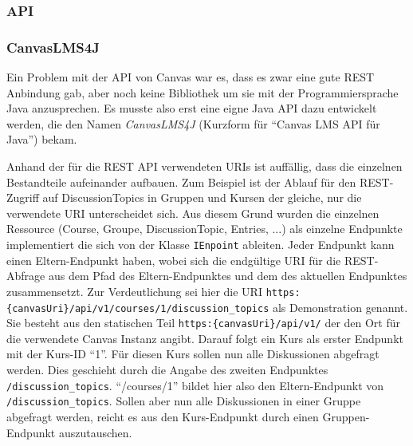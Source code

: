 \subsubsection{API} %
\label{ssub:canvas_api}


\subsubsection{CanvasLMS4J} %
\label{ssub:canvaslms4j}

Ein Problem mit der API von Canvas war es, dass es zwar eine gute REST Anbindung gab, aber noch keine Bibliothek um sie mit der Programmiersprache Java anzusprechen. Es musste also erst eine eigne Java API dazu entwickelt werden, die den Namen \emph{CanvasLMS4J} (Kurzform für \enquote{Canvas LMS API für Java}) bekam. 

Anhand der für die REST API verwendeten URIs ist auffällig, dass die einzelnen Bestandteile aufeinander aufbauen. Zum Beispiel ist der Ablauf für den REST-Zugriff auf DiscussionTopics in Gruppen und Kursen der gleiche, nur die verwendete URI unterscheidet sich. Aus diesem Grund wurden die einzelnen Ressource (Course, Groupe, DiscussionTopic, Entries, ...) als einzelne Endpunkte implementiert die sich von der Klasse \texttt{IEnpoint} ableiten. Jeder Endpunkt kann einen Eltern-Endpunkt haben, wobei sich die endgültige URI für die REST-Abfrage aus dem Pfad des Eltern-Endpunktes und dem des aktuellen Endpunktes zusammensetzt. Zur Verdeutlichung sei hier die URI \texttt{https:\{canvasUri\}/api/v1/courses/1/discussion\_topics} als Demonstration genannt. Sie besteht aus den statischen Teil \texttt{https:\{canvasUri\}/api/v1/} der den Ort für die verwendete Canvas Instanz angibt. Darauf folgt ein Kurs als erster Endpunkt mit der Kurs-ID \enquote{1}. Für diesen Kurs sollen nun alle Diskussionen abgefragt werden. Dies geschieht durch die Angabe des zweiten Endpunktes \texttt{/discussion\_topics}. \enquote{/courses/1} bildet hier also den Eltern-Endpunkt von \texttt{/discussion\_topics}. Sollen aber nun alle Diskussionen in einer Gruppe abgefragt werden, reicht es aus den Kurs-Endpunkt durch einen Gruppen-Endpunkt auszutauschen.

